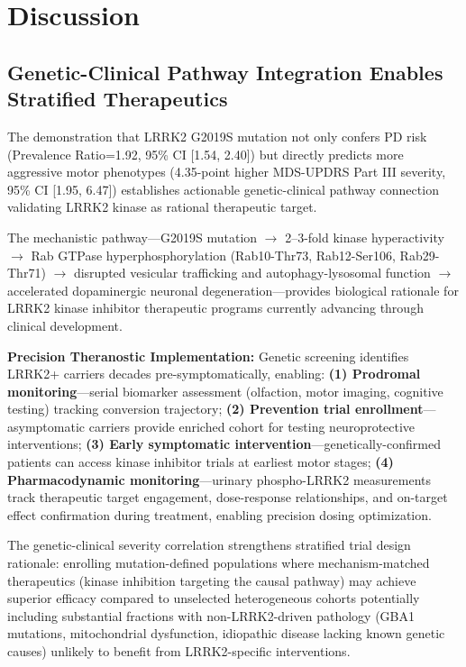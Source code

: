\documentclass[11pt]{article}
\begin{document}
\section{Discussion}

\subsection*{Genetic-Clinical Pathway Integration Enables Stratified Therapeutics}

The demonstration that LRRK2 G2019S mutation not only confers PD risk (Prevalence Ratio=1.92, 95\% CI [1.54, 2.40]) but directly predicts more aggressive motor phenotypes (4.35-point higher MDS-UPDRS Part III severity, 95\% CI [1.95, 6.47]) establishes actionable genetic-clinical pathway connection validating LRRK2 kinase as rational therapeutic target.

The mechanistic pathway—G2019S mutation $\rightarrow$ 2--3-fold kinase hyperactivity\cite{west2023lrrk2,alessi2018lrrk2} $\rightarrow$ Rab GTPase hyperphosphorylation (Rab10-Thr73, Rab12-Ser106, Rab29-Thr71)\cite{steger2016phosphoproteomics,karayel2020accurate} $\rightarrow$ disrupted vesicular trafficking and autophagy-lysosomal function $\rightarrow$ accelerated dopaminergic neuronal degeneration—provides biological rationale for LRRK2 kinase inhibitor therapeutic programs currently advancing through clinical development\cite{simuni2024lrrk2,west2023lrrk2}.

\textbf{Precision Theranostic Implementation:} Genetic screening identifies LRRK2+ carriers decades pre-symptomatically, enabling: \textbf{(1) Prodromal monitoring}—serial biomarker assessment (olfaction, motor imaging, cognitive testing) tracking conversion trajectory; \textbf{(2) Prevention trial enrollment}—asymptomatic carriers provide enriched cohort for testing neuroprotective interventions; \textbf{(3) Early symptomatic intervention}—genetically-confirmed patients can access kinase inhibitor trials at earliest motor stages; \textbf{(4) Pharmacodynamic monitoring}—urinary phospho-LRRK2 measurements track therapeutic target engagement, dose-response relationships, and on-target effect confirmation during treatment, enabling precision dosing optimization\cite{fraser2016ser,west2023lrrk2}.

The genetic-clinical severity correlation strengthens stratified trial design rationale: enrolling mutation-defined populations where mechanism-matched therapeutics (kinase inhibition targeting the causal pathway) may achieve superior efficacy compared to unselected heterogeneous cohorts potentially including substantial fractions with non-LRRK2-driven pathology (GBA1 mutations, mitochondrial dysfunction, idiopathic disease lacking known genetic causes) unlikely to benefit from LRRK2-specific interventions.
\end{document}

